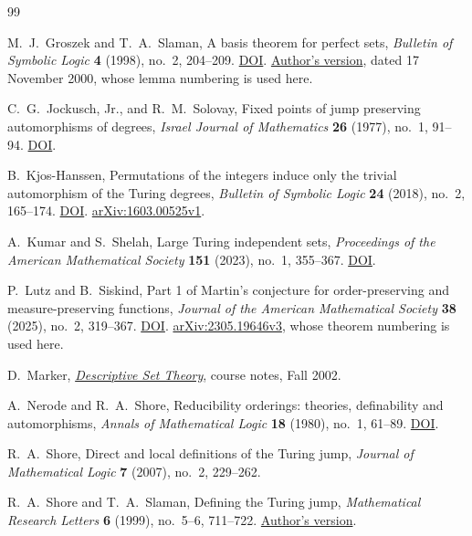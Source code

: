 \begingroup
\small
\begin{thebibliography}{99}

M.~J.~Groszek and T.~A.~Slaman,
A basis theorem for perfect sets,
\emph{Bulletin of Symbolic Logic} \textbf{4} (1998), no.~2,
204--209.
\href{https://doi.org/10.2307/421023}{DOI}.
\href{https://math.berkeley.edu/~slaman/papers/prikry.pdf}{Author's version},
dated 17 November 2000, whose lemma numbering is used here.

C.~G.~Jockusch, Jr., and R.~M.~Solovay,
Fixed points of jump preserving automorphisms of degrees,
\emph{Israel Journal of Mathematics} \textbf{26} (1977), no.~1,
91--94.
\href{https://doi.org/10.1007/BF03007659}{DOI}.

B.~Kjos-Hanssen,
Permutations of the integers induce only the trivial automorphism
of the Turing degrees,
\emph{Bulletin of Symbolic Logic} \textbf{24} (2018), no.~2,
165--174.
\href{https://doi.org/10.1017/bsl.2018.15}{DOI}.
\href{https://arxiv.org/abs/1603.00525v1}{arXiv:1603.00525v1}.

A.~Kumar and S.~Shelah,
Large Turing independent sets,
\emph{Proceedings of the American Mathematical Society}
\textbf{151} (2023), no.~1, 355--367.
\href{https://doi.org/10.1090/proc/16081}{DOI}.

P.~Lutz and B.~Siskind,
Part 1 of Martin's conjecture for order-preserving and
measure-preserving functions,
\emph{Journal of the American Mathematical Society}
\textbf{38} (2025), no.~2, 319--367.
\href{https://doi.org/10.1090/jams/1046}{DOI}.
\href{https://arxiv.org/abs/2305.19646v3}{arXiv:2305.19646v3},
whose theorem numbering is used here.

D.~Marker,
\href{https://www.math.uic.edu/~marker/math512/dst.pdf}{\emph{Descriptive Set Theory}},
course notes, Fall 2002.

A.~Nerode and R.~A.~Shore,
Reducibility orderings: theories, definability and automorphisms,
\emph{Annals of Mathematical Logic} \textbf{18} (1980), no.~1,
61--89.
\href{https://doi.org/10.1016/0003-4843(80)90004-2}{DOI}.

R.~A.~Shore,
Direct and local definitions of the Turing jump,
\emph{Journal of Mathematical Logic} \textbf{7} (2007), no.~2,
229--262.

R.~A.~Shore and T.~A.~Slaman,
Defining the Turing jump,
\emph{Mathematical Research Letters} \textbf{6} (1999), no.~5--6,
711--722.
\href{https://math.berkeley.edu/~slaman/papers/jump.pdf}{Author's version}.


\end{thebibliography}
